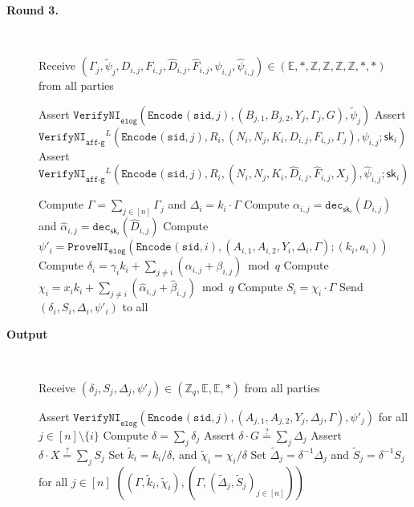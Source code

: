 \documentclass[11pt]{article}
\newcommand{\dec}{\ensuremath{\mathtt{dec}}}
\newcommand{\sid}{\ensuremath{\mathtt{sid}}}
\newcommand{\proveni}[1]{\ensuremath{\mathtt{ProveNI}_{\mathtt{#1}}}}
\newcommand{\verifyni}[1]{\ensuremath{\mathtt{VerifyNI}_{\mathtt{#1}}}}
\newcommand{\Encode}[1][]{\ensuremath{\mathtt{Encode}_{\mathtt{#1}}}}
\newcommand{\sk}{\textsf{sk}}
\newcommand{\E}{\mathbb{E}}
\newcommand{\Z}{\mathbb{Z}}
\newcommand{\?}[1]{\stackrel{?}{#1}}
\begin{document}
\begin{description}
    \item[\textbf{Round 3.}] \ 
    \begin{algorithmic}[1]
        \State Receive $(\Gamma_j, \tilde \psi_j, D_{i,j}, F_{i,j}, \hat{D}_{i,j}, \hat{F}_{i,j}, \psi_{i,j}, \hat{\psi}_{i,j})
            \in (\E, *, \Z, \Z, \Z, \Z, *, *)$ from all parties


            \State Assert $\verifyni{elog}(\Encode(\sid, j), (B_{j,1}, B_{j,2}, Y_j, \Gamma_j, G), \tilde \psi_j)$
            \State Assert $\verifyni{aff\mbox{-}g}^L(\Encode(\sid, j), R_i, (N_i, N_j, K_i, D_{i,j}, F_{i,j}, \Gamma_j), \psi_{i,j}; \sk_i)$
            \State Assert $\verifyni{aff\mbox{-}g}^L(\Encode(\sid, j), R_i, (N_i, N_j, K_i, \hat{D}_{i,j}, \hat{F}_{i,j}, X_j), \hat{\psi}_{i,j}; \sk_i)$
        \EndFor
        \Statex

        \State Compute $\Gamma = \sum_{j\in [n]} \Gamma_j$ and $\Delta_i = k_i \cdot \Gamma$
        \For{$j \in [n] \setminus \{i\}$}
            \State Compute $\alpha_{i,j} = \dec_{\sk_i}(D_{i,j})$ and $\hat{\alpha}_{i,j} = \dec_{\sk_i}(\hat{D}_{i,j})$
        \EndFor
        \State Compute $\psi'_i = \proveni{elog}(\Encode(\sid, i), (A_{i,1}, A_{i,2}, Y_i, \Delta_i, \Gamma); (k_i, a_i))$
        \State Compute $\delta_i = \gamma_i k_i + \sum_{j \ne i}(\alpha_{i,j} + \beta_{i,j}) \bmod q$
        \State Compute $\chi_i = x_i k_i + \sum_{j \ne i}(\hat{\alpha}_{i,j} + \hat{\beta}_{i,j}) \bmod q$
        \State Compute $S_i = \chi_i \cdot \Gamma$
        \Statex
        \State Send $(\delta_i, S_i, \Delta_i, \psi'_i)$ to all
    \end{algorithmic}

    \item[\textbf{Output}] \
    \begin{algorithmic}[1]
        \State Receive $(\delta_j, S_j, \Delta_j, \psi'_j) \in (\Z_q, \E, \E, *)$ from all parties

        \State Assert $\verifyni{elog}(\Encode(\sid, j), (A_{j,1}, A_{j,2}, Y_j, \Delta_j, \Gamma), \psi'_j)$
            for all $j \in [n] \setminus \{i\}$
        \State Compute $\delta = \sum_j \delta_j$
        \State Assert $\delta \cdot G \? = \sum_j \Delta_j$
        \State Assert $\delta \cdot X \? = \sum_j S_j$
        \State Set $\tilde k_i = k_i / \delta$, and $\tilde \chi_i = \chi_i / \delta$
        \State Set $\tilde \Delta_j = \delta^{-1} \Delta_j$ and $\tilde S_j = \delta^{-1} S_j$ for all $j \in [n]$
        \State \Return $((\Gamma, \tilde k_i, \tilde \chi_i), (\Gamma, (\tilde \Delta_j, \tilde S_j)_{j \in [n]}))$
    \end{algorithmic}
\end{description}
\end{document}
